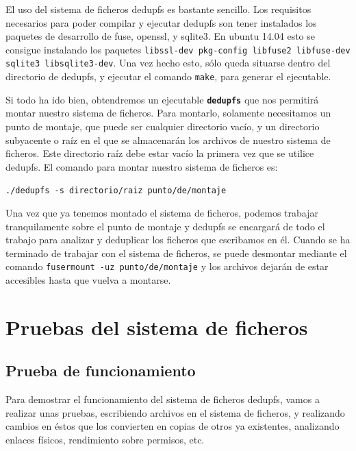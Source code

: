 \documentclass[12pt,a4paper]{article}
\begin{document}
El uso del sistema de ficheros dedupfs es bastante sencillo. Los requisitos necesarios para poder compilar y ejecutar dedupfs son tener instalados los paquetes de desarrollo de fuse, openssl, y sqlite3. En ubuntu 14.04 esto se consigue instalando los paquetes \texttt{\small libssl-dev pkg-config libfuse2 libfuse-dev sqlite3 libsqlite3-dev}. Una vez hecho esto, sólo queda situarse dentro del directorio de dedupfs, y ejecutar el comando \texttt{\small make}, para generar el ejecutable.

Si todo ha ido bien, obtendremos un ejecutable \texttt{\small \textbf{dedupfs}} que nos permitirá montar nuestro sistema de ficheros. Para montarlo, solamente necesitamos un punto de montaje, que puede ser cualquier directorio vacío, y un directorio subyacente o raíz en el que se almacenarán los archivos de nuestro sistema de ficheros. Este directorio raíz debe estar vacío la primera vez que se utilice dedupfs. El comando para montar nuestro sistema de ficheros es:
\begin{center} \vspace{-0.6cm}
 \texttt{./dedupfs -s directorio/raiz punto/de/montaje}
\end{center}

Una vez que ya tenemos montado el sistema de ficheros, podemos trabajar tranquilamente sobre el punto de montaje y dedupfs se encargará de todo el trabajo para analizar y deduplicar los ficheros que escribamos en él.
Cuando se ha terminado de trabajar con el sistema de ficheros, se puede desmontar mediante el comando \texttt{fusermount -uz punto/de/montaje} y los archivos dejarán de estar accesibles hasta que vuelva a montarse.


\newpage
\section{Pruebas del sistema de ficheros}

\subsection{Prueba de funcionamiento}

Para demostrar el funcionamiento del sistema de ficheros dedupfs, vamos a realizar unas pruebas, escribiendo archivos en el sistema de ficheros, y realizando cambios en éstos que los convierten en copias de otros ya existentes, analizando enlaces físicos, rendimiento sobre permisos, etc.
\end{document}
